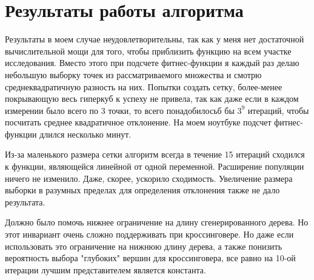 \documentclass[a4paper]{article}
\begin{document}
\section{Результаты работы алгоритма}

Результаты в моем случае неудовлетворительны, так как у меня нет достаточной вычислительной мощи для того, чтобы приблизить функцию на всем участке исследования. Вместо этого при подсчете фитнес-функции я каждый раз делаю небольшую выборку точек из рассматриваемого множества и смотрю среднеквадратичную разность на них. Попытки создать сетку, более-менее покрывающую весь гиперкуб к успеху не привела, так как даже если в каждом измерении было всего по $3$ точки, то всего понадобилосьб бы $3^9$ итераций, чтобы посчитать среднее квадратичное отклонение. На моем ноутбуке подсчет фитнес-функции длился несколько минут.

Из-за маленького размера сетки алгоритм всегда в течение 15 итераций сходился к функции, являющейся линейной от одной переменной. Расширение популяции ничего не изменило. Даже, скорее, ускорило сходимость. Увеличение размера выборки в разумных пределах для определения отклонения также не дало результата.

Должно было помочь нижнее ограничение на длину сгенерированного дерева. Но этот инвариант очень сложно поддерживать при кроссинговере. Но даже если использовать это ограничение на нижнюю длину дерева, а также понизить вероятность выбора "глубоких" вершин для кроссинговера, все равно на 10-ой итерации лучшим представителем является константа.
\end{document}
